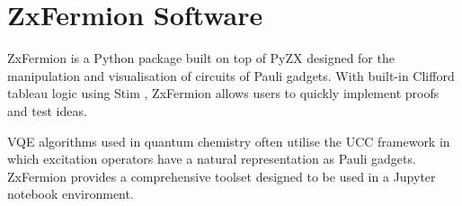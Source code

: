 \chapter{ZxFermion Software}

ZxFermion is a Python package built on top of PyZX \cite{Kissinger2020} designed for the manipulation and visualisation of circuits of Pauli gadgets. With built-in Clifford tableau logic using Stim \cite{Gidney2021}, ZxFermion allows users to quickly implement proofs and test ideas.

VQE algorithms used in quantum chemistry often utilise the UCC framework in which excitation operators have a natural representation as Pauli gadgets. ZxFermion provides a comprehensive toolset designed to be used in a Jupyter notebook environment.
